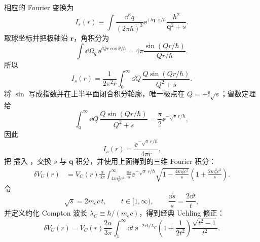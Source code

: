 \begin{derivation}[真空极化怎样修正静态势能]
相应的 Fourier 变换为
\begin{equation*}
 I_s(r)
 \equiv
 \int\frac{\dd^3 q}{(2\pi\hbar)^3}
 \ee^{+\ii\mathbf q\cdot\mathbf r/\hbar}
 \frac{\hbar^2}{\mathbf q^2+s}.
\end{equation*}
取球坐标并把极轴沿 $\mathbf r$，角积分为
\begin{equation*}
 \int\dd\Omega_q\,\ee^{\ii Qr\cos\theta/\hbar}
 =4\pi\frac{\sin(Qr/\hbar)}{Qr/\hbar}.
\end{equation*}
所以
\begin{equation*}
 I_s(r)
 =\frac1{2\pi^2r}
 \int_0^\infty\dd Q\,
 \frac{Q\sin(Qr/\hbar)}{Q^2+s}.
\end{equation*}
将 $\sin$ 写成指数并在上半平面闭合积分轮廓，唯一极点在 $Q=+\ii\sqrt s$；留数定理给
\begin{equation*}
 \int_0^\infty\dd Q\,
 \frac{Q\sin(Qr/\hbar)}{Q^2+s}
 =\frac\pi2\ee^{-\sqrt s\,r/\hbar},
\end{equation*}
因此
\begin{equation*}
 {
 I_s(r)=\frac{\ee^{-\sqrt s\,r/\hbar}}{4\pi r}.}
 \end{equation*}
把  插入 ，交换 $s$ 与 $\mathbf q$ 积分，并使用上面得到的三维 Fourier 积分：
\begin{align*}
 \delta V_U(r)
 &=V_C(r)\frac{\alpha}{3\pi}
 \int_{4m_{\mathrm e}^2c^2}^{\infty}\frac{\dd s}{s}
 \ee^{-\sqrt s\,r/\hbar}
 \sqrt{1-\frac{4m_{\mathrm e}^2c^2}{s}}
 \left(1+\frac{2m_{\mathrm e}^2c^2}{s}\right).
\end{align*}
令
\begin{equation*}
 \sqrt s=2m_{\mathrm e} c\,t,
 \qquad t\in[1,\infty),
 \qquad \frac{\dd s}{s}=\frac{2\dd t}{t},
\end{equation*}
并定义约化 Compton 波长 $\lambda_C\equiv\hbar/(m_{\mathrm e} c)$，得到经典 Uehling 修正：
\begin{equation*}
 {
 \delta V_U(r)
 =V_C(r)\frac{2\alpha}{3\pi}
 \int_1^\infty\dd t\,
 \ee^{-2rt/\lambda_C}
 \left(1+\frac1{2t^2}\right)
 \frac{\sqrt{t^2-1}}{t^2}.}
 \end{equation*}
\end{derivation}

